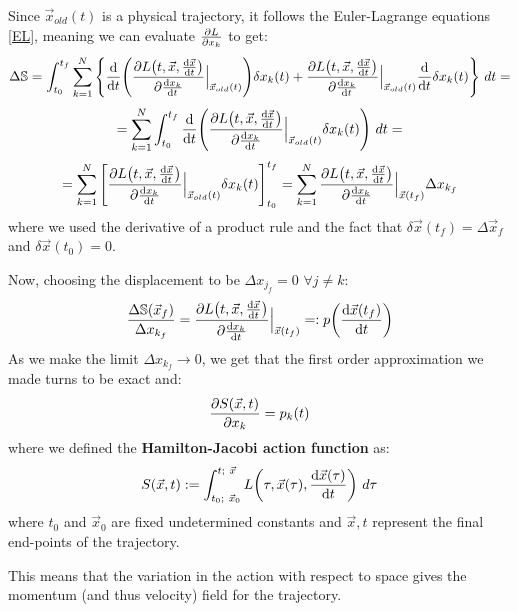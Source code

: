 \documentclass[11pt, a4paper]{article} %
\newcommand{\s}{\mathbb{S}}
\begin{document}
Since $\vec{x}_{old}(t)$ is a physical trajectory, it follows the Euler-Lagrange equations \eqref{EL}, meaning we can evaluate $\pdv{L}{x_k}$ to get:
\begin{equation}
\Delta \s=\int_{t_0}^{t_f}  \sum_{k=1}^N \qty{\dv{}{t}\qty(\pdv{L\qty(t, \vec{x}, \dv{\vec{x}}{t})}{\dv{x_k}{t}}\Big\rvert_{\vec{x}_{old}(t)})\delta x_k(t)+\pdv{L\qty(t, \vec{x}, \dv{\vec{x}}{t})}{\dv{x_k}{t}}\Big\rvert_{\vec{x}_{old}(t)}\dv{}{t}\delta x_k(t)}
\ dt=
\end{equation}
$$
= \sum_{k=1}^N \int_{t_0}^{t_f} \dv{}{t}\qty(\pdv{L\qty(t, \vec{x}, \dv{\vec{x}}{t})}{\dv{x_k}{t}}\Big\rvert_{\vec{x}_{old}(t)}\delta x_k(t))
\ dt=
$$
$$
=\sum_{k=1}^N\qty[\pdv{L\qty(t, \vec{x}, \dv{\vec{x}}{t})}{\dv{x_k}{t}}\Big\rvert_{\vec{x}_{old}(t)}\delta x_k(t)]^{t_f}_{t_0}=\sum_{k=1}^N\pdv{L\qty(t, \vec{x}, \dv{\vec{x}}{t})}{\dv{x_k}{t}}\Big\rvert_{\vec{x}(t_f)}\Delta x_{k_f}
$$
where we used the derivative of a product rule and the fact that $\delta \vec{x}(t_f)=\Delta \vec{x}_f$ and $\delta \vec{x}(t_0)=0$.

Now, choosing the displacement to be $\Delta x_{j_f}=0$ $\forall j\neq k$:
\begin{equation}
\frac{\Delta \s(\vec{x}_f)}{\Delta x_{k_f}}=\pdv{L\qty(t, \vec{x}, \dv{\vec{x}}{t})}{\dv{x_k}{t}}\Big\rvert_{\vec{x}(t_f)}=:p\qty(\dv{\vec{x}(t_f)}{t})
\end{equation}
As we make the limit $\Delta x_{k_f}\rightarrow 0$, we get that the first order approximation we made turns to be exact and:
\begin{equation}\label{momS}
\pdv{S(\vec{x},t)}{x_k}=p_k(t)
\end{equation}
where we defined the {\bf Hamilton-Jacobi action function} as:
\begin{equation}
S(\vec{x},t):=\int_{t_0;\ \vec{x}_0}^{t; \ \vec{x}} L\qty(\tau, \vec{x}(\tau),\dv{\vec{x}(\tau)}{t} )\ d\tau
\end{equation}
where $t_0$ and $\vec{x}_0$ are fixed undetermined constants and $\vec{x},t$ represent the final end-points of the trajectory.

This means that the variation in the action with respect to space gives the momentum (and thus velocity) field for the trajectory.
\end{document}
